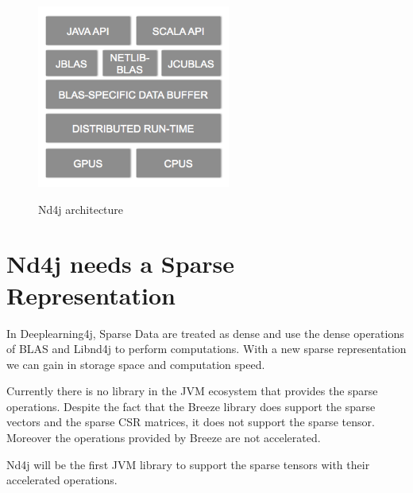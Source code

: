 \begin{figure}[h]
	\begin{center}
		\includegraphics[width=2.5in]{images/nd4j_architecture.png} 
		\label{fig:hierachy}
		\caption{Nd4j architecture}
	\end{center}
\end{figure}

\section{Nd4j needs a Sparse Representation}

In Deeplearning4j, Sparse Data are treated as dense and use the dense operations of BLAS and Libnd4j to perform computations. With a new sparse representation we can gain in storage space and computation speed.

Currently there is no library in the JVM ecosystem that provides the sparse operations. Despite the fact that the Breeze library \cite{breeze} does support the sparse vectors and the sparse CSR matrices, it does not support the sparse tensor. Moreover the operations provided by Breeze are not accelerated. 

Nd4j will be the first JVM library to support the sparse tensors with their accelerated operations.
